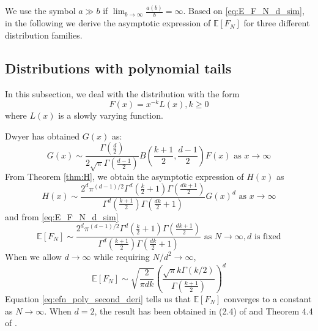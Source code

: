 \documentclass{aptpub}
\def\E{\mathbb{E}}
\begin{document}
We use the symbol $a \gg b$ if $\lim_{b\to \infty} \frac{a(b)}{b} = \infty$.
Based on \eqref{eq:E_F_N_d_sim}, in the following
we derive the asymptotic expression of $\E[F_N]$
for three different distribution families.
\subsection{Distributions with polynomial tails}
In this subsection, we deal with the distribution with the form
\begin{equation}\label{eq:F_poly_tail}
     F(x) = x^{-k} L(x), k\geq 0
\end{equation}
where $L(x)$ is a slowly varying function.

Dwyer\cite{dwyer1991convex} has obtained $G(x)$ as:
\begin{equation}
     G(x) \sim \frac{\Gamma(\frac{d}{2})}{2\sqrt{\pi} \Gamma(\frac{d-1}{2})}
     B\left(\frac{k+1}{2}, \frac{d-1}{2}\right) F(x)  \textrm{ as } x\to \infty
\end{equation}
From Theorem \ref{thm:H}, we obtain the asymptotic
expression of $H(x)$ as
\begin{equation}
     H(x) \sim \frac{2^d \pi^{(d-1)/2}\Gamma^d(\frac{k}{2}+1)
     \Gamma(\frac{dk+1}{2})}{
         \Gamma^d(\frac{k+1}{2}) \Gamma(\frac{dk}{2}+1)} G(x)^d 
         \textrm{ as } x\to \infty
\end{equation}
and from \eqref{eq:E_F_N_d_sim}
\begin{equation}\label{eq:efn_poly_second_deri}
    \E[F_N] \sim \frac{2^d \pi^{(d-1)/2}\Gamma^d(\frac{k}{2}+1)
    \Gamma(\frac{dk+1}{2})}{
        \Gamma^d(\frac{k+1}{2}) \Gamma(\frac{dk}{2}+1)}
        \textrm{ as } N \to \infty, d \textrm { is fixed}
\end{equation}
When we allow $d\to \infty$ while requiring $N/d^2 \to \infty$,
\begin{equation}\label{eq:poly_E_F_N_d_infty}
\E[F_N] \sim \sqrt{\frac{2}{\pi dk}}\left(
     \frac{\sqrt{\pi}k \Gamma(k/2)}
     {\Gamma(\frac{k+1}{2})}
 \right)^d
\end{equation}
Equation \eqref{eq:efn_poly_second_deri} tells
us that $\E[F_N]$ converges to a constant as $N \to \infty$.
When $d=2$, the result has been obtained in (2.4) of \cite{carnal1970konvexe}
and Theorem 4.4 of \cite{davis1987convex}.
\end{document}

